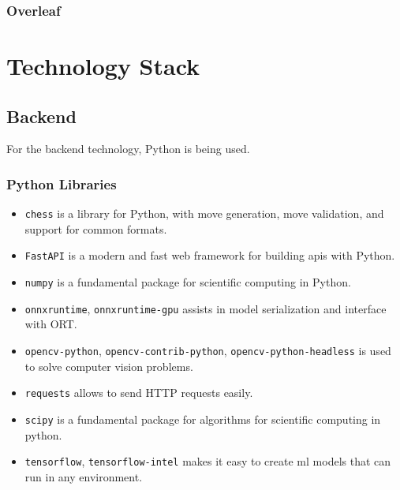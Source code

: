 \subsubsection*{Overleaf}
\label{subsubsec:overleaf}

\section{Technology Stack}
\label{sec:technology-stack}

\subsection{Backend}
\label{subsec:backend}

For the backend technology, Python is being used.

\subsubsection*{Python Libraries}
\label{subsubsec:python-libraries}

\begin{itemize}
    \item \texttt{chess} is a library for Python, with move generation, move validation, and support for common formats. \cite{python:chess}
    
    \item \texttt{FastAPI} is a modern and fast web framework for building \Glspl{api} with Python. \cite{python:fastapi}
    
    \item \texttt{numpy} is a fundamental package for scientific computing in Python. \cite{python:numpy}
    
    \item \texttt{onnxruntime}, \texttt{onnxruntime-gpu} assists in model serialization and interface with ORT. \cite{python:onnx}
    
    \item \texttt{opencv-python}, \texttt{opencv-contrib-python}, \texttt{opencv-python-headless} is used to solve computer vision problems. \cite{python:opencv}
    
    \item \texttt{requests} allows to send HTTP requests easily. \cite{python:requests}
    
    \item \texttt{scipy} is a fundamental package for algorithms for scientific computing in python. \cite{python:scipy}
    
    \item \texttt{tensorflow}, \texttt{tensorflow-intel} makes it easy to create \gls{ml} models that can run in any environment. \cite{python:tensorflow}
\end{itemize}

